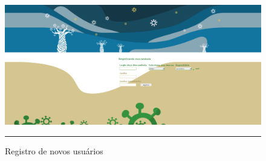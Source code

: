 \begin{figure}[htbp]
  \centering
  \includegraphics[width=\textwidth]{./Fig/InterfaceBaobaxia-registrar.pdf}
  \rule{35em}{0.5pt}
  \caption[Registro de novos usuários]{Registro de novos usuários}
  \label{fig:InterfaceBaobaxia-registrar}
\end{figure}

